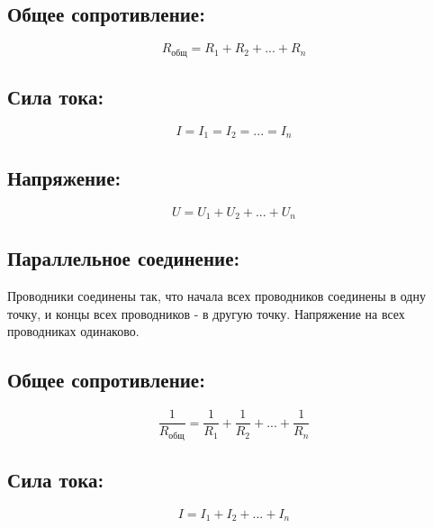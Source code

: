 \documentclass[a4paper,12pt]{article}
\begin{document}
\vspace{-9pt}
\subsection*{Общее сопротивление:}
\vspace{-3pt}
\vspace{-0.05em}
$$ R_{общ} = R_1 + R_2 + ... + R_n $$

\vspace{-9pt}
\subsection*{Сила тока:}
\vspace{-3pt}
\vspace{-0.05em}
$$ I = I_1 = I_2 = ... = I_n $$

\vspace{-9pt}
\subsection*{Напряжение:}
\vspace{-3pt}
\vspace{-0.05em}
$$ U = U_1 + U_2 + ... + U_n $$

\vspace{-9pt}
\subsection*{Параллельное соединение:}
\vspace{-3pt}
Проводники соединены так, что начала всех проводников соединены в одну точку, и концы всех проводников - в другую точку. Напряжение на всех проводниках одинаково.

\vspace{-9pt}
\subsection*{Общее сопротивление:}
\vspace{-3pt}
\vspace{-0.05em}
$$ \frac{1}{R_{общ}} = \frac{1}{R_1} + \frac{1}{R_2} + ... + \frac{1}{R_n} $$

\vspace{-9pt}
\subsection*{Сила тока:}
\vspace{-3pt}
\vspace{-0.05em}
$$ I = I_1 + I_2 + ... + I_n $$
\end{document}
